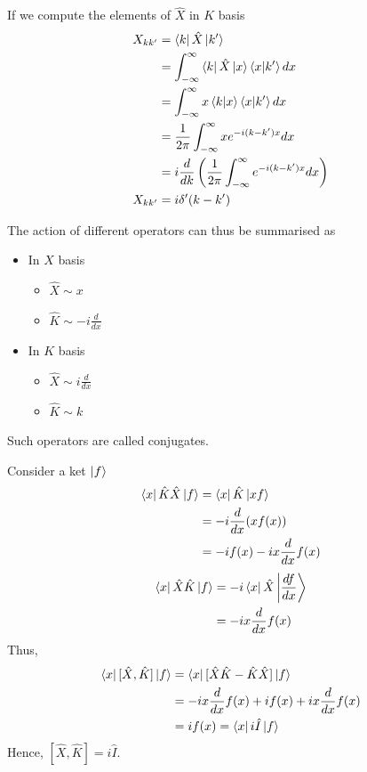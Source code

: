 \documentclass[12pt,a4paper]{report}
\newcommand{\der}[2]{\frac{d#1}{d#2}}
\begin{document}
If we compute the elements of $\hat{X}$ in $K$ basis
\begin{align*}
    X_{kk'} &= \bra{k}\hat{X}\ket{k'} \\
    &= \int_{-\infty}^{\infty} \bra{k}\hat{X}\ket{x}\bra{x}\ket{k'} dx \\
    &= \int_{-\infty}^{\infty} x\bra{k}\ket{x}\bra{x}\ket{k'} dx \\
    &= \frac{1}{2\pi}\int_{-\infty}^{\infty} xe^{-i(k-k')x} dx \\
    &= i\der{}{k}\left(\frac{1}{2\pi}\int_{-\infty}^{\infty} e^{-i(k-k')x} dx\right) \\
    X_{kk'} &= i\delta'(k-k')
\end{align*}

The action of different operators can thus be summarised as
\begin{itemize}
    \item In $X$ basis
    \begin{itemize}
        \item $\hat{X} \sim x$
        \item $\hat{K} \sim -i\der{}{x}$
    \end{itemize}
    \item In $K$ basis
    \begin{itemize}
        \item $\hat{X} \sim i\der{}{x}$
        \item $\hat{K} \sim k$
    \end{itemize}
\end{itemize}
Such operators are called conjugates.

Consider a ket $\ket{f}$
\begin{align*}
    \bra{x}\hat{K}\hat{X}\ket{f} &= \bra{x}\hat{K}\ket{xf} \\
    &= -i\der{}{x}(xf(x)) \\
    &= -if(x) - ix\der{}{x}f(x)
\end{align*}
\begin{align*}
    \bra{x}\hat{X}\hat{K}\ket{f} &= -i\bra{x}\hat{X}\ket{\der{f}{x}} \\
    &= -ix\der{}{x}f(x) \\
\end{align*}
Thus,
\begin{align*}
    \bra{x}[\hat{X},\hat{K}]\ket{f} &= \bra{x}[\hat{X}\hat{K} - \hat{K}\hat{X}]\ket{f} \\
    &= -ix\der{}{x}f(x) + if(x) + ix\der{}{x}f(x) \\
    &= if(x) = \bra{x}i\hat{I}\ket{f}
\end{align*}
Hence, $[\hat{X}, \hat{K}] = i\hat{I}$.
\end{document}
